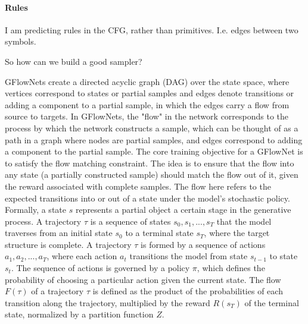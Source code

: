 \paragraph{Rules}
I am predicting rules in the CFG, rather than primitives. I.e. edges between two symbols.





























So how can we build a good sampler?


GFlowNets create a directed acyclic graph (DAG) over the state space, where vertices correspond to states or partial samples and edges denote transitions or adding a component to a partial sample, in which the edges carry a flow from source to targets.
In GFlowNets, the "flow" in the network corresponds to the process by which the network constructs a sample, which can be thought of as a path in a graph where nodes are partial samples, and edges correspond to adding a component to the partial sample.
The core training objective for a GFlowNet is to satisfy the flow matching constraint. The idea is to ensure that the flow into any state (a partially constructed sample) should match the flow out of it, given the reward associated with complete samples. The flow here refers to the expected transitions into or out of a state under the model's stochastic policy. 
Formally, a state \( s \) represents a partial object a certain stage in the generative process. A trajectory \( \tau \) is a sequence of states \( s_0, s_1, ..., s_T \) that the model traverses from an initial state \( s_0 \) to a terminal state \( s_T \), where the target structure is complete.
A trajectory \( \tau \) is formed by a sequence of actions \( a_1, a_2, ..., a_T \), where each action \( a_t \) transitions the model from state \( s_{t-1} \) to state \( s_t \). The sequence of actions is governed by a policy \( \pi \), which defines the probability of choosing a particular action given the current state.
The flow \( F(\tau) \) of a trajectory \( \tau \) is defined as the product of the probabilities of each transition along the trajectory, multiplied by the reward \( R(s_T) \) of the terminal state, normalized by a partition function \( Z \).

